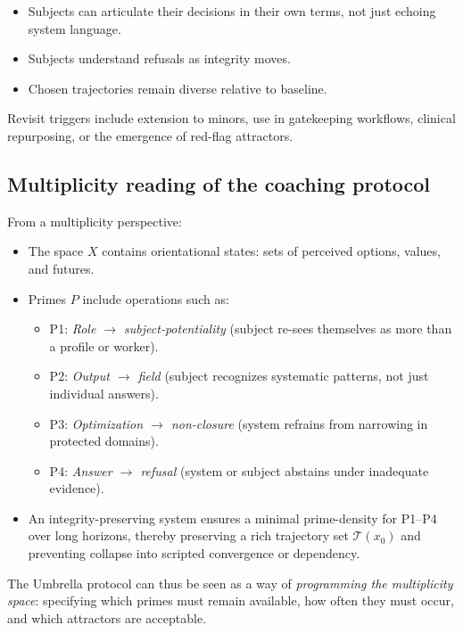 \documentclass[11pt]{article}
\begin{document}
\begin{itemize}[nosep]
  \item Subjects can articulate their decisions in their own terms, not just echoing system language.
  \item Subjects understand refusals as integrity moves.
  \item Chosen trajectories remain diverse relative to baseline.
\end{itemize}

Revisit triggers include extension to minors, use in gatekeeping workflows, clinical repurposing, or the emergence of red-flag attractors.

\subsection{Multiplicity reading of the coaching protocol}

From a multiplicity perspective:

\begin{itemize}[nosep]
  \item The space \(X\) contains orientational states: sets of perceived options, values, and futures.
  \item Primes \(P\) include operations such as:
    \begin{itemize}[nosep]
      \item P1: \emph{Role $\to$ subject-potentiality} (subject re-sees themselves as more than a profile or worker).
      \item P2: \emph{Output $\to$ field} (subject recognizes systematic patterns, not just individual answers).
      \item P3: \emph{Optimization $\to$ non-closure} (system refrains from narrowing in protected domains).
      \item P4: \emph{Answer $\to$ refusal} (system or subject abstains under inadequate evidence).
    \end{itemize}
  \item An integrity-preserving system ensures a minimal prime-density for P1--P4 over long horizons, thereby preserving a rich trajectory set \(\mathcal{T}(x_0)\) and preventing collapse into scripted convergence or dependency.
\end{itemize}

The Umbrella protocol can thus be seen as a way of \emph{programming the multiplicity space}: specifying which primes must remain available, how often they must occur, and which attractors are acceptable.
\end{document}
